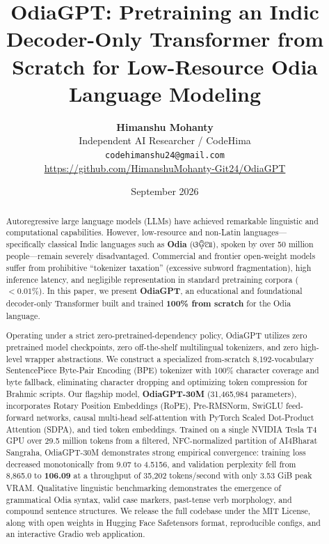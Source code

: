 \documentclass[10pt,twocolumn,letterpaper]{article}
\title{\textbf{\Large OdiaGPT: Pretraining an Indic Decoder-Only Transformer from Scratch for Low-Resource Odia Language Modeling}}
\author{
  \textbf{Himanshu Mohanty}\\
  Independent AI Researcher / CodeHima\\
  \texttt{codehimanshu24@gmail.com}\\
  \url{https://github.com/HimanshuMohanty-Git24/OdiaGPT}
}
\date{September 2026}
\newcommand{\odia}[1]{{\odiafont #1}}
\newcommand{\odia}[1]{\textit{#1}}
\begin{document}
\maketitle

\begin{abstract}
Autoregressive large language models (LLMs) have achieved remarkable linguistic and computational capabilities. However, low-resource and non-Latin languages---specifically classical Indic languages such as \textbf{Odia} (\odia{ଓଡ଼ିଆ}), spoken by over 50 million people---remain severely disadvantaged. Commercial and frontier open-weight models suffer from prohibitive ``tokenizer taxation'' (excessive subword fragmentation), high inference latency, and negligible representation in standard pretraining corpora ($<0.01\%$). In this paper, we present \textbf{OdiaGPT}, an educational and foundational decoder-only Transformer built and trained \textbf{100\% from scratch} for the Odia language.

Operating under a strict zero-pretrained-dependency policy, OdiaGPT utilizes zero pretrained model checkpoints, zero off-the-shelf multilingual tokenizers, and zero high-level wrapper abstractions. We construct a specialized from-scratch 8,192-vocabulary SentencePiece Byte-Pair Encoding (BPE) tokenizer with 100\% character coverage and byte fallback, eliminating character dropping and optimizing token compression for Brahmic scripts. Our flagship model, \textbf{OdiaGPT-30M} (31,465,984 parameters), incorporates Rotary Position Embeddings (RoPE), Pre-RMSNorm, SwiGLU feed-forward networks, causal multi-head self-attention with PyTorch Scaled Dot-Product Attention (SDPA), and tied token embeddings. Trained on a single NVIDIA Tesla T4 GPU over 29.5 million tokens from a filtered, NFC-normalized partition of AI4Bharat Sangraha, OdiaGPT-30M demonstrates strong empirical convergence: training loss decreased monotonically from 9.07 to 4.5156, and validation perplexity fell from 8,865.0 to \textbf{106.09} at a throughput of 35,202 tokens/second with only 3.53 GiB peak VRAM. Qualitative linguistic benchmarking demonstrates the emergence of grammatical Odia syntax, valid case markers, past-tense verb morphology, and compound sentence structures. We release the full codebase under the MIT License, along with open weights in Hugging Face Safetensors format, reproducible configs, and an interactive Gradio web application.
\end{abstract}
\end{document}
